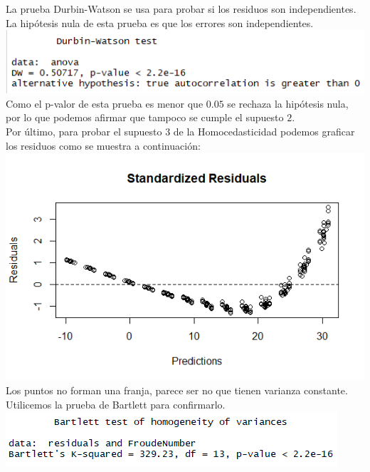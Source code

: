 \documentclass[twoside]{article}
\begin{document}
\begin{multicols}{2}
La prueba Durbin-Watson se usa para probar si los residuos son independientes. La hip\'otesis nula de esta prueba es que los errores son independientes.\\

\includegraphics[scale = 0.5]{images/pic_18.png} \\

Como el p-valor de esta prueba es menor que $0.05$ se rechaza la hip\'otesis nula, por lo que podemos afirmar que tampoco se cumple el supuesto $2$.\\

Por \'ultimo, para probar el supuesto $3$ de la Homocedasticidad podemos graficar los residuos como se muestra a continuaci\'on:\\

\includegraphics[scale = 0.4]{images/pic_19.png} \\

Los puntos no forman una franja, parece ser no que tienen varianza constante. Utilicemos la prueba de Bartlett para confirmarlo.\\

\includegraphics[scale = 0.5]{images/pic_20.png} \\


\end{multicols}
\end{document}
